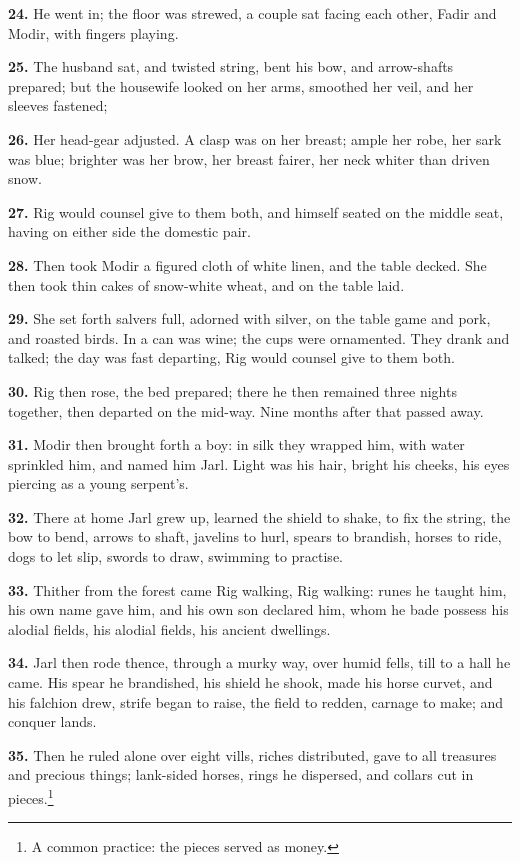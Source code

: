 \textbf{24.} He went in; the floor was strewed, a couple sat facing each
other, Fadir and Modir, with fingers playing.

\textbf{25.} The husband sat, and twisted string, bent his bow, and
arrow-shafts prepared; but the housewife looked on her arms, smoothed
her veil, and her sleeves fastened;

\textbf{26.} Her head-gear adjusted. A clasp was on her breast; ample her
robe, her sark was blue; brighter was her brow, her breast fairer, her
neck whiter than driven snow.

\textbf{27.} Rig would counsel give to them both, and himself seated on the
middle seat, having on either side the domestic pair.

\textbf{28.} Then took Modir a figured cloth of white linen, and the table
decked. She then took thin cakes of snow-white wheat, and on the table
laid.

\textbf{29.} She set forth salvers full, adorned with silver, on the table
game and pork, and roasted birds. In a can was wine; the cups were
ornamented. They drank and talked; the day was fast departing, Rig
would counsel give to them both.

\textbf{30.} Rig then rose, the bed prepared; there he then remained three
nights together, then departed on the mid-way. Nine months after that
passed away.

\textbf{31.} Modir then brought forth a boy: in silk they wrapped him, with
water sprinkled him, and named him Jarl. Light was his hair, bright
his cheeks, his eyes piercing as a young serpent's.

\textbf{32.} There at home Jarl grew up, learned the shield to shake, to fix
the string, the bow to bend, arrows to shaft, javelins to hurl,
spears to brandish, horses to ride, dogs to let slip, swords to draw,
swimming to practise.

\textbf{33.} Thither from the forest came Rig walking, Rig walking: runes he
taught him, his own name gave him, and his own son declared him, whom
he bade possess his alodial fields, his alodial fields, his ancient
dwellings.

\textbf{34.} Jarl then rode thence, through a murky way, over humid fells,
till to a hall he came. His spear he brandished, his shield he shook,
made his horse curvet, and his falchion drew, strife began to raise,
the field to redden, carnage to make; and conquer lands.

\textbf{35.} Then he ruled alone over eight vills, riches distributed, gave
to all treasures and precious things; lank-sided horses, rings he
dispersed, and collars cut in pieces.\footnote{A common practice: the pieces served as money.}

